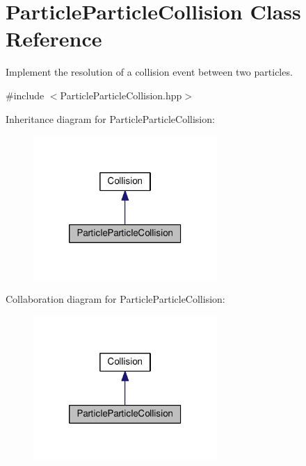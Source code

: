 \hypertarget{classParticleParticleCollision}{\section{Particle\+Particle\+Collision Class Reference}
\label{classParticleParticleCollision}
}


Implement the resolution of a collision event between two particles.  




{\ttfamily \#include $<$Particle\+Particle\+Collision.\+hpp$>$}



Inheritance diagram for Particle\+Particle\+Collision\+:\nopagebreak
\begin{figure}[H]
\begin{center}
\leavevmode
\includegraphics[width=198pt]{classParticleParticleCollision__inherit__graph}
\end{center}
\end{figure}


Collaboration diagram for Particle\+Particle\+Collision\+:\nopagebreak
\begin{figure}[H]
\begin{center}
\leavevmode
\includegraphics[width=198pt]{classParticleParticleCollision__coll__graph}
\end{center}
\end{figure}
